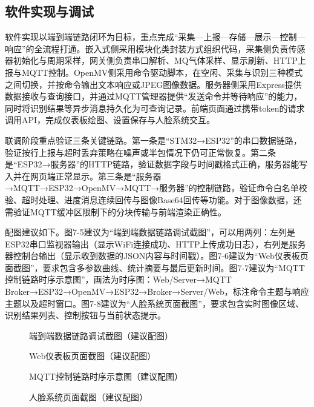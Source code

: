 \subsection{软件实现与调试}
\par 软件实现以端到端链路闭环为目标，重点完成“采集—上报—存储—展示—控制—响应”的全流程打通。嵌入式侧采用模块化类封装方式组织代码，采集侧负责传感器初始化与周期采样，网关侧负责串口解析、MQ气体采样、显示刷新、HTTP上报与MQTT控制。OpenMV侧采用命令驱动脚本，在空闲、采集与识别三种模式之间切换，并按命令输出文本响应或JPEG图像数据。服务器侧采用Express提供数据接收与查询接口，并通过MQTT管理器提供“发送命令并等待响应”的能力，同时将识别结果等异步消息持久化为可查询记录。前端页面通过携带token的请求调用API，完成仪表板绘图、设置保存与人脸系统交互。
\par 联调阶段重点验证三条关键链路。第一条是“STM32→ESP32”的串口数据链路，验证按行上报与超时丢弃策略在噪声或半包情况下仍可正常恢复。第二条是“ESP32→服务器”的HTTP链路，验证数据字段与时间戳格式正确，服务器能写入并在网页端正常显示。第三条是“服务器→MQTT→ESP32→OpenMV→MQTT→服务器”的控制链路，验证命令白名单校验、超时处理、进度消息连续回传与图像Base64回传等功能。对于图像数据，还需验证MQTT缓冲区限制下的分块传输与前端渲染正确性。
\par 配图建议如下。图7-5建议为“端到端数据链路调试截图”，可以用两列：左列是ESP32串口监视器输出（显示WiFi连接成功、HTTP上传成功日志），右列是服务器控制台输出（显示收到数据的JSON内容与时间戳）。图7-6建议为“Web仪表板页面截图”，要求包含多参数曲线、统计摘要与最后更新时间。图7-7建议为“MQTT控制链路时序示意图”，画法为时序图：Web/Server→MQTT Broker→ESP32→OpenMV→ESP32→Broker→Server/Web，标注命令主题与响应主题以及超时窗口。图7-8建议为“人脸系统页面截图”，要求包含实时图像区域、识别结果列表、控制按钮与当前状态提示。
\begin{figure}[H]
\centering
{}
\caption{端到端数据链路调试截图（建议配图）}
\label{fig:e2e_data_debug}
\end{figure}
\begin{figure}[H]
\centering
{}
\caption{Web仪表板页面截图（建议配图）}
\label{fig:web_dashboard}
\end{figure}
\begin{figure}[H]
\centering
{}
\caption{MQTT控制链路时序示意图（建议配图）}
\label{fig:mqtt_sequence}
\end{figure}
\begin{figure}[H]
\centering
{}
\caption{人脸系统页面截图（建议配图）}
\label{fig:face_page}
\end{figure}


